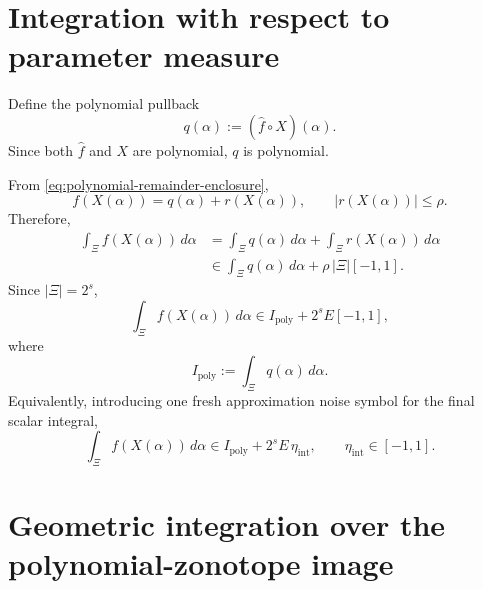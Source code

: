 \documentclass[11pt]{article}
\newcommand{\abs}[1]{\left\lvert #1\right\rvert}
\begin{document}
\section{Integration with respect to parameter measure}

Define the polynomial pullback
\begin{equation}
    q(\alpha):=(\widehat f\circ X)(\alpha).
    \label{eq:pullback-polynomial}
\end{equation}
Since both \(\widehat f\) and \(X\) are polynomial, \(q\) is polynomial.

From \eqref{eq:polynomial-remainder-enclosure},
\[
    f(X(\alpha))=q(\alpha)+r(X(\alpha)),
    \qquad
    \abs{r(X(\alpha))}\leq \rho.
\]
Therefore,
\begin{align}
    \int_\Xi f(X(\alpha))\,d\alpha
    &=
    \int_\Xi q(\alpha)\,d\alpha
    +
    \int_\Xi r(X(\alpha))\,d\alpha \\
    &\in
    \int_\Xi q(\alpha)\,d\alpha
    +
    \rho\,\abs{\Xi}[-1,1].
\end{align}
Since \(\abs{\Xi}=2^s\),
\begin{equation}
    \boxed{
    \int_\Xi f(X(\alpha))\,d\alpha
    \in
    I_{\mathrm{poly}}+2^sE[-1,1],
    }
    \label{eq:parameter-integral-enclosure}
\end{equation}
where
\[
    I_{\mathrm{poly}}:=\int_\Xi q(\alpha)\,d\alpha.
\]
Equivalently, introducing one fresh approximation noise symbol for the final
scalar integral,
\begin{equation}
    \int_\Xi f(X(\alpha))\,d\alpha
    \in
    I_{\mathrm{poly}}+2^sE\,\eta_{\mathrm{int}},
    \qquad
    \eta_{\mathrm{int}}\in[-1,1].
    \label{eq:parameter-integral-noise}
\end{equation}

\section{Geometric integration over the polynomial-zonotope image}
\end{document}

